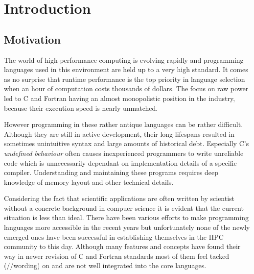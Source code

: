 \chapter{Introduction}
\label{chap:Introduction}


\section{Motivation}
\label{sec:Introduction::Motivation}

The world of high-performance computing is evolving rapidly and programming languages used in this environment are held up to a very high standard. It comes as no surprise that runtime performance is the top priority in language selection when an hour of computation costs thousands of dollars. The focus on raw power led to C and Fortran having an almost monopolistic position in the industry, because their execution speed is nearly unmatched.

However programming in these rather antique languages can be rather difficult. Although they are still in active development, their long lifespans resulted in sometimes unintuitive syntax and large amounts of historical debt. Especially C's \textit{undefined behaviour} often causes inexperienced programmers to write unreliable code which is unnecessarily dependant on implementation details of a specific compiler. Understanding and maintaining these programs requires deep knowledge of memory layout and other technical details.

Considering the fact that scientific applications are often written by scientist without a concrete background in compuer science it is evident that the current situation is less than ideal. There have been various efforts to make programming languages more accessible in the recent years but unfortunately none of the newly emerged ones have been successful in establishing themselves in the HPC community to this day. Although many features and concepts have found their way in newer revision of C and Fortran standards most of them feel tacked (//wording) on and are not well integrated into the core languages.

